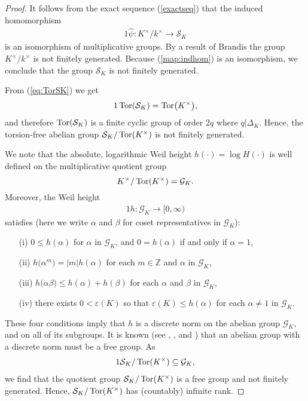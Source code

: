 \documentclass[11pt]{amsart}
\numberwithin{equation}{eqncounter}
\def\IZ{\mathbb Z}
\newcommand{\KT}{K^{\times}/\Tor(K^{\times})}
\newcommand{\G}{\mathcal{G}}
\def\Tor{\mathop{\rm Tor}\nolimits}
\def\Sc{\mathcal{S}}
\begin{document}
\begin{proof}  
It follows from the exact sequence (\ref{exactseq}) that the induced homomorphism
\begin{alignat}1\label{map:indhom}
\widehat{\psi} : K^{\times}/k^{\times} \rightarrow \Sc_K
\end{alignat}
is an isomorphism of multiplicative groups.  By a result of Brandis \cite{brandis1965} the group $K^{\times}/k^{\times}$ is not finitely generated.  
Because (\ref{map:indhom}) is an isomorphism, we conclude that the group $\Sc_K$ is  not finitely generated.  

From (\ref{eq:TorSK}) we get
\begin{alignat}1\label{eq:Tors}
\Tor(\Sc_K) = \Tor\bigl(K^{\times}\bigr),
\end{alignat}
and therefore $\Tor(\Sc_K)$ is a finite cyclic group of order $2q$ where $q | \Delta_K$.  
Hence, the torsion-free abelian group $\Sc_K/\Tor(K^\times)$ is not finitely generated.

We note that the absolute, logarithmic Weil height $h(\cdot)=\log H(\cdot)$ is
well defined on the multiplicative quotient group
\begin{equation*}\label{eq:quotgroup}
\KT = \G_K.
\end{equation*}
Moreover, the Weil height
\begin{alignat*}1
h : \G_K \rightarrow [0, \infty)
\end{alignat*}
satisfies (here we write $\alpha$ and $\beta$ for coset representatives in $\G_K$):
\begin{itemize}
\item[ ]
\item[(i)] $0 \leq h(\alpha)$ for $\alpha$ in $\G_K$, and $0 = h(\alpha)$ if and only if $\alpha = 1$,
\item[ ]
\item[(ii)] $h\bigl(\alpha^m\bigr) = |m| h(\alpha)$ for each $m \in \IZ$ and $\alpha$ in $\G_K$,
\item[ ]
\item[(iii)] $h\bigl(\alpha \beta\bigr) \leq h(\alpha) + h(\beta)$ for each $\alpha$ and $\beta$ in $\G_K$,
\item[ ]
\item[(iv)] there exists $0 < \varepsilon(K)$ so that $\varepsilon(K) \leq h(\alpha)$ for each $\alpha \neq 1$ in $\G_K$.
\item[ ]
\end{itemize}
These four conditions imply that $h$ is a  discrete norm on the abelian group $\G_K$, and on all of its 
subgroups. 
It is known (see \cite{lawrence1984}, \cite{steprans1985},
and \cite{zorzitto1985}) that an abelian group with a discrete norm must be a free group.   As
\begin{alignat*}1
\Sc_K/\Tor(K^\times) \subseteq \G_K,
\end{alignat*}
we find that the quotient group $\Sc_K/\Tor(K^\times)$ is a free group and not finitely generated. Hence, 
$\Sc_K/\Tor(K^\times)$ has (countably) infinite rank.  
\end{proof}
 
\end{document}
